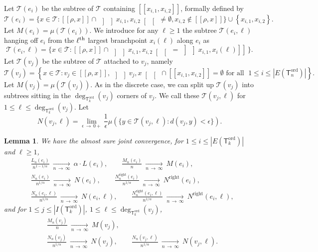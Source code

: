 \documentclass[10pt]{amsart}
\newtheorem{lemm}[theo]{Lemma}\newtheorem{prop}[theo]{Proposition}\newtheorem{coro}[theo]{Corollary}\newtheorem{conj}[theo]{Conjecture}
\theoremstyle{definition}\newtheorem{defi}[theo]{Definition}\newtheorem{rema}[theo]{Remark}\newtheorem{exam}[theo]{Example}\newtheorem{exem}[theo]{Example}\newtheorem{nota}[theo]{Notation}
\newcommand{\abs}[1]{\left\lvert#1\right\rvert}
\newcommand{\seg}[2]{\left[\! \left[#1, #2 \right] \! \right]}
\newcommand{\oseg}[2]{\, \left] \! \left] #1, #2 \right[\! \right[\,}
\newcommand{\hoseg}[2]{\, \left] \! \left] #1, #2 \right] \! \right] \,}
\newcommand{\ord}{\mathrm{ord}}
\newcommand{\Rightll}{\mathrm{right}}
\newcommand{\cT}{\mathcal{T}}
\newcommand{\sT}{\mathsf{T}}
\begin{document}
Let $\cT(e_i)$ be the subtree of $\cT$ containing $\seg{x_{i,1}}{x_{i,2}}$, formally defined by
\[
\cT(e_i) = \big\{x \in \cT: \seg{\rho}{x} \cap \oseg{x_{i,1}}{x_{i,2}} \neq \emptyset, x_{i,2} \notin \seg{\rho}{x}\big\} \cup \left\{x_{i,1},x_{i,2}\right\}.
\]
Let $M(e_i) = \mu(\cT(e_i))$. We introduce for any $\ell\geq 1$ the subtree $\cT(e_i,\ell)$ hanging off $e_i$ from the $\ell^{\rm th}$ largest branchpoint $x_i(\ell)$ along $e_i$ as
\[
\cT(e_i,\ell) = \big\{x \in \cT: \seg{\rho}{x} \cap \oseg{x_{i,1}}{x_{i,2}} = \hoseg{x_{i,1}}{x_{i}(\ell)}\big\}.
\]
Let $\cT(v_j)$ be the subtree of $\cT$ attached to $v_j$, namely
\[
\cT(v_j) = \left\{x \in \cT: v_j \in \seg{\rho}{x}, \oseg{v_j}{x} \cap \seg{x_{i,1}}{x_{i,2}} = \emptyset \text{ for all }\; 1 \le i \le \abs{E\left(\sT_n^{\ord}\right)}\right\}.
\]
Let $M(v_j) = \mu(\cT(v_j))$. As in the discrete case, we can split up $\cT(v_j)$ into subtrees sitting in the $\deg_{\sT_k^{\ord}}(v_j)$ corners of $v_j$. We call these $\cT(v_j, \ell)$ for $1 \le \ell \le \deg_{\sT_k^{\ord}}(v_j)$. Let
\[
N\left(v_j, \ell\right) = \lim_{\epsilon\,\to\,0+} \frac{1}{\epsilon} \mu\left(\big\{y \in \cT(v_j, \ell): d(v_j,y) < \epsilon\big\}\right).
\]

\begin{lemm}\label{lem:grandeurslimites}
We have the almost sure joint convergence, for $1 \leq i\leq |E(\sT_k^{\ord})|$ and $\ell \ge 1$,
\begin{align*}
& \frac{L_{n}(e_i)}{n^{1-1/\alpha}} \ \underset{n\, \rightarrow\,\infty} \longrightarrow \ \alpha \cdot L(e_i),
\qquad\frac{M_n(e_i)}{n} \ \underset{n\,\rightarrow \,\infty} \longrightarrow \ M(e_i), \\
& \frac{N_{n}(e_i)}{n^{1/\alpha}} \ \underset{n \,\rightarrow\,\infty} \longrightarrow \ N(e_i), \qquad \frac{N^{\Rightll}_{n}(e_i)}{n^{1/\alpha}} \ \underset{n\,\rightarrow\,\infty} \longrightarrow \ N^{\Rightll}(e_i), \\
& \frac{N_{n}(e_i,\ell)}{n^{1/\alpha}} \ \underset{n \,\rightarrow\,\infty} \longrightarrow \ N(e_i,\ell), \qquad \frac{N^{\Rightll}_{n}(e_i, \ell)}{n^{1/\alpha}} \ \underset{n\,\rightarrow\,\infty} \longrightarrow \ N^{\Rightll}(e_i,\ell),
\end{align*}
and for $1 \leq j \leq |I(\sT_k^{\ord})|$, $1 \leq \ell \leq \deg_{\sT_k^{\ord}}(v_j)$,
\begin{align*}
& \frac{M_{n}(v_j)}{n} \ \underset{n\,\rightarrow \,\infty} \longrightarrow \ M(v_j), \\
& \frac{N_n(v_j)}{n^{1/\alpha}} \ \underset{n \,\rightarrow\,\infty} \longrightarrow \ {N(v_j)}, \qquad \frac{N_n(v_j, \ell)}{n^{1/\alpha}} \ \underset{n\,\rightarrow\,\infty} \longrightarrow \ {N(v_j, \ell)}.
\end{align*}
\end{lemm}
\end{document}
